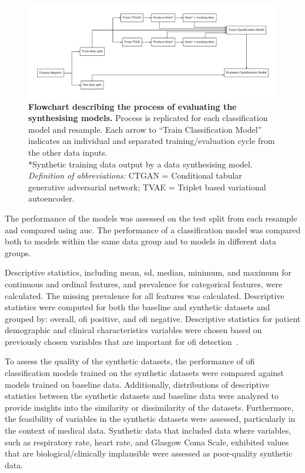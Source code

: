 \documentclass[12pt, a4paper]{article}
\begin{document}
\begin{figure}
	\centering
	\includegraphics[width=\textwidth]{figures/model_flowchart.pdf}
	\caption{\textbf{Flowchart describing the process of evaluating the synthesising models.}
		Process is replicated for each classification model and resample. Each arrow to ``Train Classification Model''
		indicates an individual and separated training/evaluation cycle from the other data inputs.\\
		*Synthetic training data output by a data synthesising model.\\
		\textit{Definition of abbreviations:} CTGAN = Conditional tabular generative adversarial network;
		TVAE = Triplet based variational autoencoder.}%
	\label{fig:modelflowchart}
\end{figure}

The performance of the models was assessed on the test split from each resample and compared using \acrshort{auc}. The
performance of a classification model was compared both to models within the same data group and to models in different
data groups.

Descriptive statistics, including mean, \acrfull{sd}, median, minimum, and maximum for continuous and ordinal features,
and prevalence for categorical features, were calculated. The missing prevalence for all features was calculated.
Descriptive statistics were computed for both the baseline and synthetic datasets and grouped by: overall,
\acrshort{ofi} positive, and \acrshort{ofi} negative. Descriptive statistics for patient demographic and clinical
characteristics variables were chosen based on previously chosen variables that are important for \acrshort{ofi}
detection~\cite{attergrim_predicting_2023}.

To assess the quality of the synthetic datasets, the performance of \acrshort{ofi} classification models trained on the
synthetic datasets were compared against models trained on baseline data. Additionally, distributions of descriptive
statistics between the synthetic datasets and baseline data were analyzed to provide insights into the similarity or
dissimilarity of the datasets. Furthermore, the feasibility of variables in the synthetic datasets were assessed,
particularly in the context of medical data. Synthetic data that included data where variables, such as respiratory
rate, heart rate, and Glasgow Coma Scale, exhibited values that are biological/clinically implausible were assessed as
poor-quality synthetic data.
\end{document}
